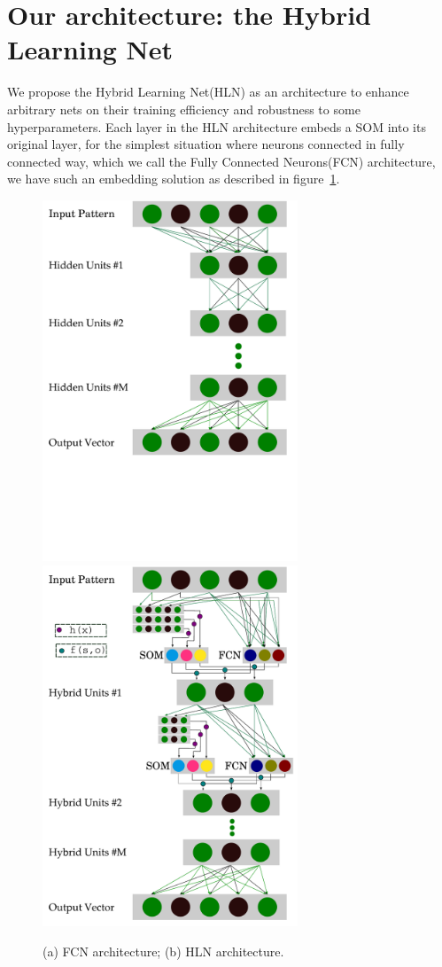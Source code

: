 \documentclass[3p,times,procedia]{elsarticle}
\begin{document}
\section{Our architecture: 
the Hybrid Learning Net}
We propose the Hybrid Learning Net(HLN) as
an architecture to enhance arbitrary nets
on their training efficiency and robustness 
to some hyperparameters.
Each layer in the HLN architecture embeds a
SOM into its original layer, for the simplest
situation where neurons connected in fully
connected way, which we call the Fully 
Connected Neurons(FCN) architecture, we have 
such an embedding solution as described in 
figure~\ref{fig:1}.

\begin{figure}[h]
	\centerline{
		\includegraphics[width=3in]{FCN}
		\hspace*{5mm}
		\includegraphics[width=3in]{HLN}
	}
\caption{(a) FCN architecture; 
	(b) HLN architecture.}
	\label{fig:1}
\end{figure}
\end{document}
